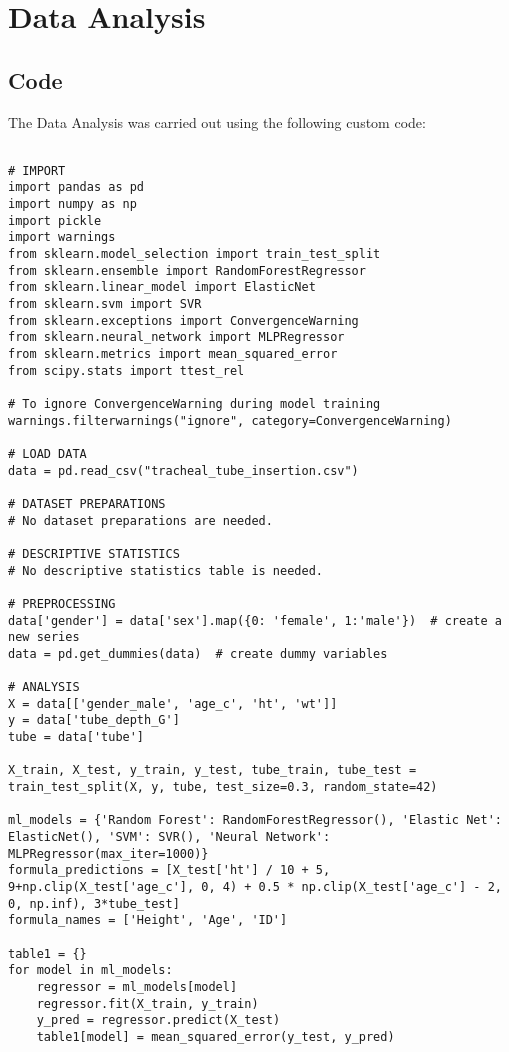 \documentclass[11pt]{article}
\begin{document}
\section{Data Analysis}
\subsection{{Code}}
The Data Analysis was carried out using the following custom code:

\begin{verbatim}

# IMPORT
import pandas as pd
import numpy as np
import pickle
import warnings
from sklearn.model_selection import train_test_split
from sklearn.ensemble import RandomForestRegressor
from sklearn.linear_model import ElasticNet
from sklearn.svm import SVR
from sklearn.exceptions import ConvergenceWarning
from sklearn.neural_network import MLPRegressor
from sklearn.metrics import mean_squared_error
from scipy.stats import ttest_rel

# To ignore ConvergenceWarning during model training
warnings.filterwarnings("ignore", category=ConvergenceWarning)

# LOAD DATA
data = pd.read_csv("tracheal_tube_insertion.csv")

# DATASET PREPARATIONS
# No dataset preparations are needed.

# DESCRIPTIVE STATISTICS
# No descriptive statistics table is needed.

# PREPROCESSING 
data['gender'] = data['sex'].map({0: 'female', 1:'male'})  # create a new series
data = pd.get_dummies(data)  # create dummy variables

# ANALYSIS
X = data[['gender_male', 'age_c', 'ht', 'wt']]
y = data['tube_depth_G']
tube = data['tube']

X_train, X_test, y_train, y_test, tube_train, tube_test = train_test_split(X, y, tube, test_size=0.3, random_state=42)

ml_models = {'Random Forest': RandomForestRegressor(), 'Elastic Net': ElasticNet(), 'SVM': SVR(), 'Neural Network': MLPRegressor(max_iter=1000)}
formula_predictions = [X_test['ht'] / 10 + 5, 9+np.clip(X_test['age_c'], 0, 4) + 0.5 * np.clip(X_test['age_c'] - 2, 0, np.inf), 3*tube_test]
formula_names = ['Height', 'Age', 'ID']

table1 = {}
for model in ml_models:
    regressor = ml_models[model]
    regressor.fit(X_train, y_train)
    y_pred = regressor.predict(X_test)
    table1[model] = mean_squared_error(y_test, y_pred)
    

\end{verbatim}
\end{document}
